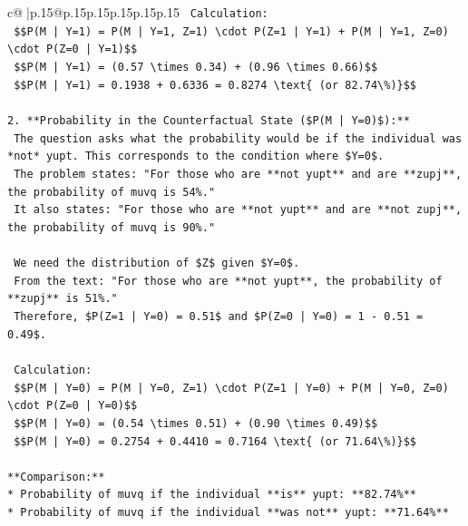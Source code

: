 \documentclass{article}
\begin{document}
{\begin{supertabular}{c@{$\;$}|p{.15\linewidth}@{}p{.15\linewidth}p{.15\linewidth}p{.15\linewidth}p{.15\linewidth}p{.15\linewidth}}
{{{\texttt{    Calculation:} \\
\texttt{    \$\$P(M | Y=1) = P(M | Y=1, Z=1) \textbackslash{}cdot P(Z=1 | Y=1) + P(M | Y=1, Z=0) \textbackslash{}cdot P(Z=0 | Y=1)\$\$} \\
\texttt{    \$\$P(M | Y=1) = (0.57 \textbackslash{}times 0.34) + (0.96 \textbackslash{}times 0.66)\$\$} \\
\texttt{    \$\$P(M | Y=1) = 0.1938 + 0.6336 = 0.8274 \textbackslash{}text\{ (or 82.74\textbackslash{}\%)\}\$\$} \\
\\ 
\texttt{2.  **Probability in the Counterfactual State (\$P(M | Y=0)\$):**} \\
\texttt{    The question asks what the probability would be if the individual was *not* yupt. This corresponds to the condition where \$Y=0\$.} \\
\texttt{    The problem states: "For those who are **not yupt** and are **zupj**, the probability of muvq is 54\%."} \\
\texttt{    It also states: "For those who are **not yupt** and are **not zupj**, the probability of muvq is 90\%."} \\
\\ 
\texttt{    We need the distribution of \$Z\$ given \$Y=0\$.} \\
\texttt{    From the text: "For those who are **not yupt**, the probability of **zupj** is 51\%."} \\
\texttt{    Therefore, \$P(Z=1 | Y=0) = 0.51\$ and \$P(Z=0 | Y=0) = 1 {-} 0.51 = 0.49\$.} \\
\\ 
\texttt{    Calculation:} \\
\texttt{    \$\$P(M | Y=0) = P(M | Y=0, Z=1) \textbackslash{}cdot P(Z=1 | Y=0) + P(M | Y=0, Z=0) \textbackslash{}cdot P(Z=0 | Y=0)\$\$} \\
\texttt{    \$\$P(M | Y=0) = (0.54 \textbackslash{}times 0.51) + (0.90 \textbackslash{}times 0.49)\$\$} \\
\texttt{    \$\$P(M | Y=0) = 0.2754 + 0.4410 = 0.7164 \textbackslash{}text\{ (or 71.64\textbackslash{}\%)\}\$\$} \\
\\ 
\texttt{**Comparison:**} \\
\texttt{*   Probability of muvq if the individual **is** yupt: **82.74\%**} \\
\texttt{*   Probability of muvq if the individual **was not** yupt: **71.64\%**} \\
\\ 
}}}
\end{supertabular}}
\end{document}
